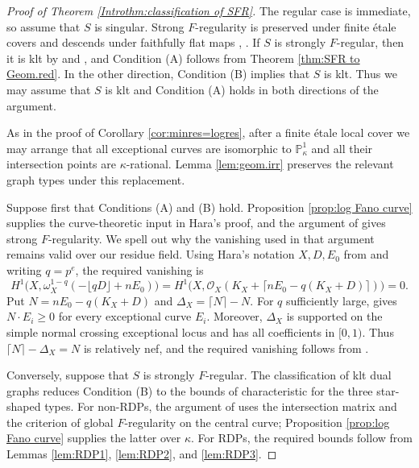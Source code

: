 \documentclass[12pt]{amsart}
\def\ge{\geqslant}
\newcommand{\PP}{\mathbb{P}}
\newcommand{\sO}{\mathcal{O}}
\theoremstyle{plain}
\theoremstyle{definition}
\theoremstyle{remark}
\newtheorem{defn and notation}[thm]{Definition and Notation}
\theoremstyle{plain}
\numberwithin{equation}{thm}
\begin{document}
\begin{proof}[Proof of Theorem \ref{Introthm:classification of SFR}]
The regular case is immediate, so assume that $S$ is singular.
Strong $F$-regularity is preserved under finite \'etale covers and descends under faithfully flat maps
\cite[Corollary 2.4]{Hochster-Huneke89}, \cite[Theorem 4.8]{Hara-Watanabe}.
If $S$ is strongly $F$-regular, then it is klt by
\cite[Theorem 3.3]{Hara-Watanabe} and \cite[Theorem 4.3]{SS10},
and Condition (A) follows from Theorem \ref{thm:SFR to Geom.red}.
In the other direction, Condition (B) implies that $S$ is klt.
Thus we may assume that $S$ is klt and Condition (A) holds in both directions of the argument.

As in the proof of Corollary \ref{cor:minres=logres}, after a finite \'etale local cover we may arrange that all exceptional curves are isomorphic to $\PP^1_\kappa$ and all their intersection points are $\kappa$-rational.
Lemma \ref{lem:geom.irr} preserves the relevant graph types under this replacement.

Suppose first that Conditions (A) and (B) hold.
Proposition \ref{prop:log Fano curve} supplies the curve-theoretic input in Hara's proof, and the argument of \cite[Section 4.2]{Hara(two-dim)} gives strong $F$-regularity.
We spell out why the vanishing used in that argument remains valid over our residue field.
Using Hara's notation $X,D,E_0$ from \cite[Section 3.8]{Hara(two-dim)} and writing $q=p^e$, the required vanishing is
\[
H^1\bigl(X,\omega_X^{1-q}(-\lfloor qD\rfloor+nE_0)\bigr)
=H^1\bigl(X,\sO_X(K_X+\lceil nE_0-q(K_X+D)\rceil)\bigr)=0.
\]
Put $N=nE_0-q(K_X+D)$ and $\Delta_X=\lceil N\rceil-N$.
For $q$ sufficiently large, \cite[Lemma 3.9]{Hara(two-dim)} gives $N\cdot E_i\ge0$ for every exceptional curve $E_i$.
Moreover, $\Delta_X$ is supported on the simple normal crossing exceptional locus and has all coefficients in $[0,1)$.
Thus $\lceil N\rceil-\Delta_X=N$ is relatively nef, and the required vanishing follows from \cite[Theorem 10.4]{Kol13}.

Conversely, suppose that $S$ is strongly $F$-regular.
The classification of klt dual graphs reduces Condition (B) to the bounds of characteristic for the three star-shaped types.
For non-RDPs, the argument of \cite[Section 4.4]{Hara(two-dim)} uses the intersection matrix and the criterion of global $F$-regularity on the central curve; Proposition \ref{prop:log Fano curve} supplies the latter over $\kappa$.
For RDPs, the required bounds follow from Lemmas \ref{lem:RDP1}, \ref{lem:RDP2}, and \ref{lem:RDP3}.
\end{proof}
\end{document}
